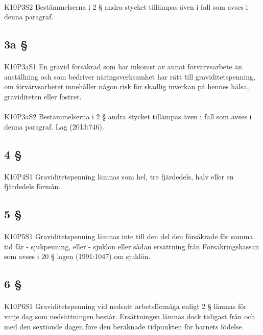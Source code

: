 \documentclass[a4paper,notitlepage,openany,10pt]{book}
\begin{document}
\paragraph*{}
{\tiny K10P3S2}
Bestämmelserna i 2 § andra stycket tillämpas även i fall som avses i denna paragraf.
\subsection*{3a §}
\paragraph*{}
{\tiny K10P3aS1}
En gravid försäkrad som har inkomst av annat förvärvsarbete än anställning och som bedriver näringsverksamhet har rätt till graviditetspenning, om förvärvsarbetet innehåller någon risk för skadlig inverkan på hennes hälsa, graviditeten eller fostret.
\paragraph*{}
{\tiny K10P3aS2}
Bestämmelserna i 2 § andra stycket tillämpas även i fall som avses i denna paragraf.
Lag (2013:746).
\subsection*{4 §}
\paragraph*{}
{\tiny K10P4S1}
Graviditetspenning lämnas som hel, tre fjärdedels, halv eller en fjärdedels förmån.
\subsection*{5 §}
\paragraph*{}
{\tiny K10P5S1}
Graviditetspenning lämnas inte till den del den försäkrade för samma tid får
\newline - sjukpenning, eller
\newline - sjuklön eller sådan ersättning från Försäkringskassan som avses i 20 § lagen (1991:1047) om sjuklön.
\subsection*{6 §}
\paragraph*{}
{\tiny K10P6S1}
Graviditetspenning vid nedsatt arbetsförmåga enligt 2 § lämnas för varje dag som nedsättningen består. Ersättningen lämnas dock tidigast från och med den sextionde dagen före den beräknade tidpunkten för barnets födelse.
\end{document}
